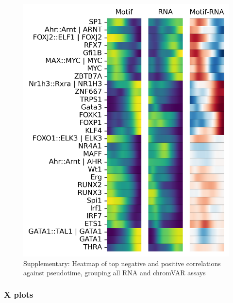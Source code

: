\documentclass[a4paper]{article}
\begin{document}
\begin{figure}[!htb]
  \centering
  \includegraphics[width=\textwidth]{../figures/hematopoiesis/Erythroid_40_103_single_smooth_none_heatmap_grouped_assays.png}
  \caption{Supplementary: Heatmap of top negative and positive correlations against pseudotime, grouping all RNA and chromVAR assays}
\end{figure}

\FloatBarrier
\subsubsection{X plots}
 
\end{document}
